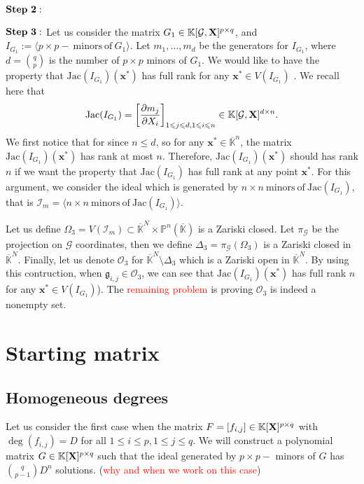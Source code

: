 \documentclass[11pt]{article}
\numberwithin{Property}{section}
\numberwithin{Theorem}{section}
\numberwithin{Proposition}{section}
\numberwithin{Lemma}{section}
\numberwithin{Corollary}{section}
\numberwithin{Definition}{section}
\numberwithin{Remark}{section}
\numberwithin{Conjecture}{section}
\numberwithin{Problem}{section}
\numberwithin{Example}{section}
\numberwithin{Claim}{section}
\renewcommand{\leq}{\leqslant}
\def\bar{\overline}
\newcommand{\field}{\mathbb{K}} %
\newcommand{\mat}[1]{\mathbf{\MakeUppercase{#1}}} %
\newcommand{\todo}[1]{\textcolor{red}{#1}} %
\begin{document}
$\bf{Step \ 2:}$

$\bf{Step \ 3:}$
Let us consider the matrix $G_1 \in \field[\mathcal{G}, \mat{X}]^{p \times q}$, and $I_{G_1} := \langle p \times p - \ \mathrm{minors \ of } \ G_1 \rangle$. Let $m_1, \ldots, m_d$ be the generators for $I_{G_1}$, where $d = {{q}\choose{p}}$ is the number of $p \times p$ minors of $G_1$. We would like to have the property that $\mathrm{Jac}(I_{G_1})(\mathbf{x}^*)$ has full rank for any $\mathbf{x}^* \in V(I_{G_1})$ . We recall here that $$\mathrm{Jac}(I_{G_1}) = \left[\frac{\partial m_j}{\partial X_i}\right]_{1 \leq j \leq d, 1 \leq i \leq n} \in \field[\mathcal{G}, \mat{X}]^{d \times n}. $$
We first notice that for since $n \leq d$, so for any $\mathbf{x}^* \in \bar{\field}^n$, the matrix $\mathrm{Jac}(I_{G_1})(\mathbf{x}^*)$ has rank at most $n$. Therefore, $\mathrm{Jac}(I_{G_1})(\mathbf{x}^*)$ should has rank $n$ if we want the property that $\mathrm{Jac}(I_{G_1})$ has full rank at any point $\mathbf{x}^*$. For this argument, we consider the ideal which is generated by $n \times n \ \mathrm{minors \ of} \ \mathrm{Jac}(I_{G_1})$, that is $\mathcal{I}_{m} = \langle n \times n  \ \mathrm{minors \ of} \ \mathrm{Jac}(I_{G_1}) \rangle$.

Let us define $\Omega_3 = V(\mathcal{I}_m) \subset \bar{\field}^N \times \mathbb{P}^n(\bar{\field})$ is a Zariski closed. Let $\pi_{\mathcal{G}}$ be the projection on $\mathcal{G}$ coordinates, then we define $\Delta_3 = \pi_{\mathcal{G}}(\Omega_3)$ is a Zariski closed in $\bar{\field}^N $. Finally, let us denote  $\mathcal{O}_3$ for $\bar{\field}^N \setminus \Delta_3$ which is a Zariski open in $\bar{\field}^N $. By using this contruction, when $\mathfrak{g}_{i,j} \in \mathcal{O}_3$, we can see that  $\mathrm{Jac}(I_{G_1})(\mathbf{x}^*)$ has full rank $n$ for any $\mathbf{x}^* \in V(I_{G_1})$). The \todo{remaining problem } is proving $\mathcal{O}_3$ is indeed a nonempty set. 
\section{Starting matrix}
\subsection{Homogeneous degrees}
Let us consider the first case when the matrix $F = [f_{i,j}] \in \field[\mat{X}]^{p\times q}$ with $\deg(f_{i,j}) = D$ for all $1 \leq i \leq p, 1 \leq j \leq q$. We will construct a polynomial matrix $G \in \field[\mat{X}]^{p \times q}$ such that the ideal generated by $p \times p-$ minors of $G$ has ${q \choose {p-1}}D^n$ solutions. (\todo{why and when we work on this case})
\end{document}
